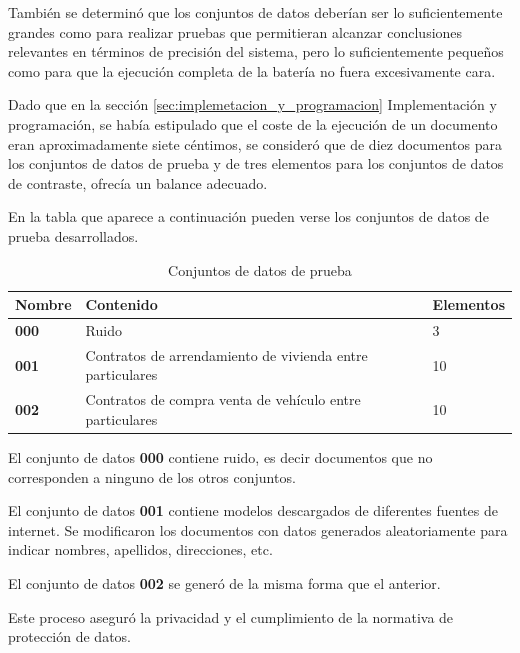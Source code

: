 También se determinó que los conjuntos de datos deberían ser lo suficientemente grandes como para realizar pruebas que
permitieran alcanzar conclusiones relevantes en términos de precisión del sistema, pero lo suficientemente pequeños
como para que la ejecución completa de la batería no fuera excesivamente cara.

Dado que en la sección \ref{sec:implemetacion_y_programacion} Implementación y programación, se había estipulado
que el coste de la ejecución de un documento eran aproximadamente siete céntimos, se consideró que de diez documentos
para los conjuntos de datos de prueba y de tres elementos para los conjuntos de datos de contraste, ofrecía un
balance adecuado.

En la tabla que aparece a continuación pueden verse los conjuntos de datos de prueba desarrollados.

\begin{table}[h]
    \renewcommand{\arraystretch}{1.5}
    \setlength{\tabcolsep}{10pt}
    \centering
    \begin{tabular}{>{\bfseries}p{} p{} p{}}
        \toprule
        \textbf{Nombre} & \textbf{Contenido}                                        & \textbf{Elementos} \\
        \midrule
        \textbf{000}    & Ruido                                                     & 3                  \\
        \textbf{001}    & Contratos de arrendamiento de vivienda entre particulares & 10                 \\
        \textbf{002}    & Contratos de compra venta de vehículo entre particulares  & 10                 \\
        \bottomrule
    \end{tabular}
    \caption{Conjuntos de datos de prueba}
    \label{tab:conjunto_datos_prueba}
\end{table}

El conjunto de datos \textbf{000} contiene ruido, es decir documentos que no corresponden a ninguno de los
otros conjuntos.

El conjunto de datos \textbf{001} contiene modelos descargados de diferentes fuentes de internet.
Se modificaron los documentos con datos generados aleatoriamente para indicar nombres, apellidos, direcciones, etc.

El conjunto de datos \textbf{002} se generó de la misma forma que el anterior.

Este proceso aseguró la privacidad y el cumplimiento de la normativa de protección de datos.




